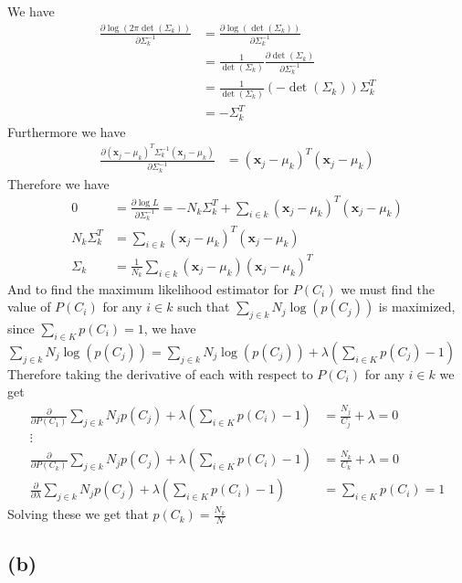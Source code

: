 \documentclass[12pt]{article}
\begin{document}
We have
\begin{align*}
    \frac{\partial\log(2\pi\det(\Sigma_k))}{\partial \Sigma_k^{-1}}&=\frac{\partial\log(\det(\Sigma_k))}{\partial \Sigma_k^{-1}}\\
    &=\frac{1}{\det(\Sigma_k)}\frac{\partial \det(\Sigma_k)}{\partial \Sigma_k^{-1}}\\
    &=\frac{1}{\det(\Sigma_k)}(-\det(\Sigma_k))\Sigma_k^T\\
    &=-\Sigma_k^T
\end{align*}
Furthermore we have
\begin{align*}
    \frac{\partial(\textbf{x}_j-\mu_k)^T\Sigma_k^{-1}(\textbf{x}_j-\mu_k)}{\partial \Sigma_k^{-1}}&=(\textbf{x}_j-\mu_k)^T(\textbf{x}_j-\mu_k)
\end{align*}
Therefore we have
\begin{align*}
    0&=\frac{\partial \log{L}}{\partial \Sigma_k^{-1}}=-N_k\Sigma_k^T+\sum_{i\in k}(\textbf{x}_j-\mu_k)^T(\textbf{x}_j-\mu_k)\\
    N_k\Sigma_k^T&=\sum_{i\in k}(\textbf{x}_j-\mu_k)^T(\textbf{x}_j-\mu_k)\\
    \Sigma_k&=\boxed{\frac{1}{N_k}\sum_{i\in k}(\textbf{x}_j-\mu_k)(\textbf{x}_j-\mu_k)^T}
\end{align*}
And to find the maximum likelihood estimator for $P(C_i)$ we must find the value of $P(C_i)$ for any $i\in k$ such that 
$\sum_{j \in k} N_j\log(p(C_j))$ is maximized, since $\sum_{i\in K}p(C_i)=1$, we have $\sum_{j \in k} N_j\log(p(C_j))=\sum_{j \in k} N_j\log(p(C_j))+\lambda(\sum_{i\in K}p(C_j)-1)$
Therefore taking the derivative of each with respect to $P(C_i)$ for any $i\in k$ we get
\begin{align*}
    \frac{\partial }{\partial P(C_1)}\sum_{j \in k} N_jp(C_j)+\lambda(\sum_{i\in K}p(C_i)-1)&=\frac{N_j}{C_j}+\lambda=0\\
    \vdots \\
    \frac{\partial }{\partial P(C_k)}\sum_{j \in k} N_jp(C_j)+\lambda(\sum_{i\in K}p(C_i)-1)&=\frac{N_k}{C_k}+\lambda=0\\
    \frac{\partial }{\partial \lambda}\sum_{j \in k} N_jp(C_j)+\lambda(\sum_{i\in K}p(C_i)-1)&=\sum_{i\in K}p(C_i)=1
\end{align*}
Solving these we get that $p(C_k)=\boxed{\frac{N_k}{N}}$

\subsection*{(b)}
\end{document}
